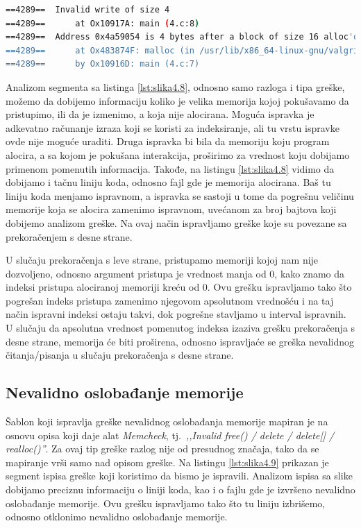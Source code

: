 \documentclass[12pt,oneside]{memoir}
\theoremstyle{plain}
\theoremstyle{definition}
\begin{document}

\begin{lstlisting}[style=terminal,caption={Ispis greške nevalidnog čitanja}, label={lst:slika4.8},language={bash}]   
==4289==  Invalid write of size 4
==4289==      at Ox10917A: main (4.c:8)
==4289==  Address 0x4a59054 is 4 bytes after a block of size 16 alloc'd
==4289==      at Ox483874F: malloc (in /usr/lib/x86_64-linux-gnu/valgrind/vgpreload_memcheck-amd64-linux.so) 
==4289==      by Ox10916D: main (4.c:7)
\end{lstlisting}

Analizom segmenta sa listinga \ref{lst:slika4.8}, odnosno samo razloga i tipa greške, možemo da dobijemo informaciju koliko je velika memorija kojoj pokušavamo da pristupimo, ili da je izmenimo, a koja nije alocirana. Moguća ispravka je adkevatno računanje izraza koji se koristi za indeksiranje, ali tu vrstu ispravke ovde nije moguće uraditi. Druga ispravka bi bila da memoriju koju program alocira, a sa kojom je pokušana interakcija, proširimo za vrednost koju dobijamo primenom pomenutih informacija. Takođe, na listingu \ref{lst:slika4.8} vidimo da dobijamo i tačnu liniju koda, odnosno fajl gde je memorija alocirana. Baš tu liniju koda menjamo ispravnom, a ispravka se sastoji u tome da pogrešnu veličinu memorije koja se alocira zamenimo ispravnom, uvećanom za broj bajtova koji dobijemo analizom greške. Na ovaj način ispravljamo greške koje su povezane sa prekoračenjem s desne strane. 

U slučaju prekoračenja s leve strane, pristupamo memoriji kojoj nam nije dozvoljeno, odnosno argument pristupa je vrednost manja od 0, kako znamo da indeksi pristupa alociranoj memoriji kreću od 0. Ovu grešku ispravljamo tako što pogrešan indeks pristupa zamenimo njegovom apsolutnom vrednošću i na taj način ispravni indeksi ostaju takvi, dok pogrešne stavljamo u interval ispravnih. U slučaju da apsolutna vrednost pomenutog indeksa izaziva grešku prekoračenja s desne strane, memorija će biti proširena, odnosno ispravljaće se greška nevalidnog čitanja/pisanja u slučaju prekoračenja s desne strane.  


\subsection{Nevalidno oslobađanje memorije}
Šablon koji ispravlja greške nevalidnog oslobađanja memorije mapiran je na osnovu opisa koji daje alat \textit{Memcheck}, tj.~\textit{,,Invalid free() / delete / delete[] / realloc()''}. Za ovaj tip greške razlog nije od presudnog značaja, tako da se mapiranje vrši samo nad opisom greške. Na listingu \ref{lst:slika4.9} prikazan je segment ispisa greške koji koristimo da bismo je ispravili. Analizom ispisa sa slike dobijamo preciznu informaciju o liniji koda, kao i o fajlu gde je izvršeno nevalidno oslobađanje memorije. Ovu grešku ispravljamo tako što tu liniju izbrišemo, odnosno otklonimo nevalidno oslobađanje memorije. 
\end{document}
